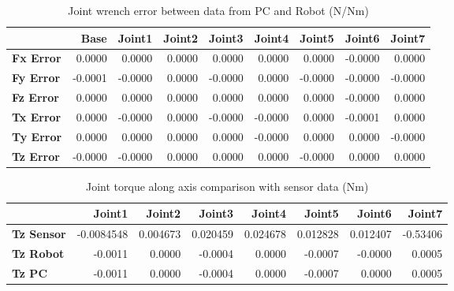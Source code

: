 \begin{table}[h!]
	\centering
	\caption{Joint wrench error between data from PC and Robot (N/Nm)}
	\label{wrech_Error_Pose11}
	\begin{tabular}{|l|r|r|r|r|r|r|r|r|}
		\hline
		\textbf{}  & \textbf{Base} & \textbf{Joint1}  & \textbf{Joint2}  & \textbf{Joint3}  & \textbf{Joint4}  & \textbf{Joint5}  & \textbf{Joint6}  & \textbf{Joint7} \\ \hline
		\textbf{Fx Error}  & 0.0000        & 0.0000        & 0.0000        & 0.0000        & 0.0000        & 0.0000        & -0.0000        & 0.0000 \\ \hline
		\textbf{Fy Error}  & -0.0001        & -0.0000        & 0.0000        & -0.0000        & 0.0000        & -0.0000        & -0.0000        & -0.0000 \\ \hline
		\textbf{Fz Error}  & 0.0000        & 0.0000        & 0.0000        & 0.0000        & 0.0000        & 0.0000        & -0.0000        & 0.0000 \\ \hline
		\textbf{Tx Error}  & 0.0000        & -0.0000        & 0.0000        & -0.0000        & -0.0000        & 0.0000        & -0.0001        & 0.0000 \\ \hline
		\textbf{Ty Error}  & 0.0000        & 0.0000        & 0.0000        & 0.0000        & -0.0000        & 0.0000        & 0.0000        & -0.0000 \\ \hline
		\textbf{Tz Error}  & -0.0000        & -0.0000        & 0.0000        & 0.0000        & 0.0000        & -0.0000        & 0.0000        & 0.0000 \\ \hline
	\end{tabular}
\end{table}

\begin{table}[h!]
	\centering
	\caption{Joint torque along axis comparison with sensor data (Nm)}
	\label{wrech_Sensor_Pose11}
	\begin{tabular}{|l|r|r|r|r|r|r|r|}
		\hline
		\textbf{} & \textbf{Joint1} & \textbf{Joint2} & \textbf{Joint3} & \textbf{Joint4} & \textbf{Joint5} & \textbf{Joint6} & \textbf{Joint7} \\ \hline
		\textbf{Tz Sensor}  & -0.0084548           & 0.004673           & 0.020459            & 0.024678           & 0.012828           & 0.012407           & -0.53406           \\ \hline
		\textbf{Tz Robot}  	& -0.0011           & 0.0000           & -0.0004            & 0.0000           & -0.0007           & -0.0000           & 0.0005           \\ \hline
		\textbf{Tz PC}  	& -0.0011           & 0.0000           & -0.0004            & 0.0000           & -0.0007           & 0.0000           & 0.0005           \\ \hline
	\end{tabular}
\end{table}

